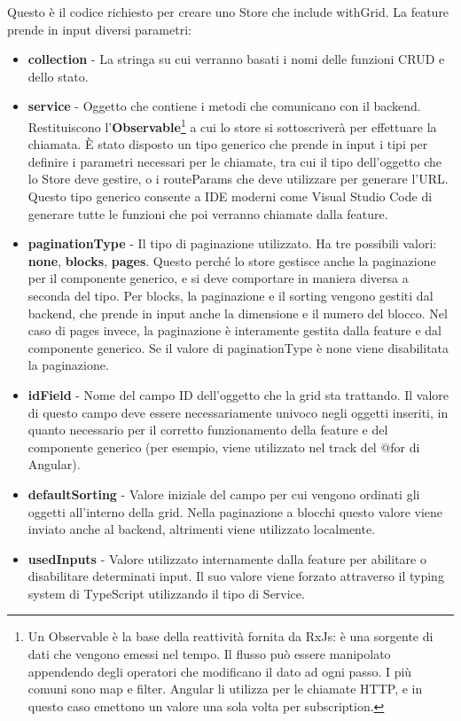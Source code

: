 Questo \`e il codice richiesto per creare uno Store che include withGrid. La feature prende in input diversi parametri:
\begin{itemize}
  \item \textbf{collection} - La stringa su cui verranno basati i nomi delle funzioni CRUD e dello stato.
  \item \textbf{service} - Oggetto che contiene i metodi che comunicano con il backend. Restituiscono
    l'\textbf{Observable}\footnote{Un Observable \`e la base della reattivit\`a fornita da RxJs: \`e una sorgente di dati che vengono emessi nel tempo.
      Il flusso pu\`o essere manipolato appendendo degli operatori che modificano il dato ad ogni passo. I pi\`u comuni sono map e filter.
    Angular li utilizza per le chiamate HTTP, e in questo caso emettono un valore una sola volta per subscription.}
    a cui lo store si sottoscriver\`a
    per effettuare la chiamata. \`E stato disposto un tipo generico che prende in input i tipi per definire i parametri necessari per le chiamate, tra cui il tipo
    dell'oggetto che lo Store deve gestire, o i routeParams che deve utilizzare per generare l'URL. Questo tipo generico consente a IDE moderni come Visual Studio Code di
    generare tutte le funzioni che poi verranno chiamate dalla feature.
  \item \textbf{paginationType} - Il tipo di paginazione utilizzato. Ha tre possibili valori: \textbf{none}, \textbf{blocks}, \textbf{pages}. Questo perch\'e lo store
    gestisce anche la paginazione per il componente generico, e si deve comportare in maniera diversa a seconda del tipo. Per blocks, la paginazione e il sorting
    vengono gestiti dal backend, che prende in input anche la dimensione e il numero del blocco. Nel caso di pages invece, la paginazione \`e interamente gestita
    dalla feature e dal componente generico. Se il valore di paginationType \`e none viene disabilitata la paginazione.
  \item \textbf{idField} - Nome del campo ID dell'oggetto che la grid sta trattando. Il valore di questo campo deve essere necessariamente univoco negli oggetti inseriti,
    in quanto necessario per il corretto funzionamento della feature e del componente generico (per esempio, viene utilizzato nel track del @for di Angular).
  \item \textbf{defaultSorting} - Valore iniziale del campo per cui vengono ordinati gli oggetti all'interno della grid. Nella paginazione a blocchi questo valore viene inviato
    anche al backend, altrimenti viene utilizzato localmente.
  \item \textbf{usedInputs} - Valore utilizzato internamente dalla feature per abilitare o disabilitare determinati input. Il suo valore viene forzato attraverso il typing system
    di TypeScript utilizzando il tipo di Service.
\end{itemize}

